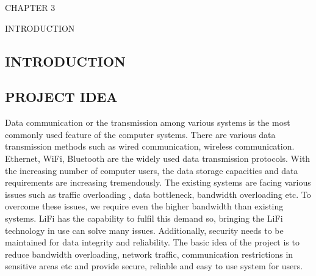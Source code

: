 \documentclass[12pt,a4paper]
{article}
\numberwithin{table}{section}
\begin{document}
{{{\begin{flushleft}
\begin{itemize}
				
		\end{itemize}



	\end{flushleft}






\newpage


\begin{minipage}{15cm}


\vspace{4 in}
 \begin{center} 
\begin{Huge}
CHAPTER 3

\vspace{0.5 in}

INTRODUCTION
\end{Huge}

\end{center}
\end{minipage}
\newpage

\begin{center}
\section{INTRODUCTION}
\end{center}
 {\setlength{\baselineskip}{1.0\baselineskip} 		
  \vspace{0.1in}			
  
  \vspace{15 pt}
 }
 
\subsection{PROJECT IDEA}
\vspace{0.1 in}
\begin{itemize}	
Data communication or the transmission among various systems is the most commonly used feature of the computer systems. There are various data transmission methods such as wired communication, wireless communication. Ethernet, WiFi, Bluetooth are the widely used data transmission protocols. With the increasing number of computer users, the data storage capacities and data requirements are increasing tremendously. The existing systems are facing various issues such as traffic overloading , data bottleneck,  bandwidth overloading etc. To overcome these issues, we require even the higher bandwidth than existing systems. LiFi has the capability to fulfil this demand so, bringing the LiFi technology in use can solve many issues. Additionally, security needs to be maintained for data integrity and reliability. The basic idea of the project is to reduce bandwidth overloading, network traffic, communication restrictions in sensitive areas etc and provide secure, reliable and easy to use system for users.
\end{itemize}
\vspace{0.4 in}

}}}
\end{document}
